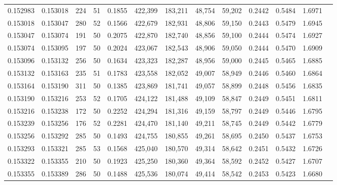 \begin{tabular}{rrrrrrrrrrrrr}
0.152983 & 0.153018 &   224 &  51 &                                     0.1855 & 422,399 & 183,211 &  48,754 &  59,202 & 0.2442 & 0.5484 & 1.6971 \\
0.153018 & 0.153047 &   280 &  52 &                                     0.1566 & 422,679 & 182,931 &  48,806 &  59,150 & 0.2443 & 0.5479 & 1.6945 \\
0.153047 & 0.153074 &   191 &  50 &                                     0.2075 & 422,870 & 182,740 &  48,856 &  59,100 & 0.2444 & 0.5474 & 1.6927 \\
0.153074 & 0.153095 &   197 &  50 &                                     0.2024 & 423,067 & 182,543 &  48,906 &  59,050 & 0.2444 & 0.5470 & 1.6909 \\
0.153096 & 0.153132 &   256 &  50 &                                     0.1634 & 423,323 & 182,287 &  48,956 &  59,000 & 0.2445 & 0.5465 & 1.6885 \\
0.153132 & 0.153163 &   235 &  51 &                                     0.1783 & 423,558 & 182,052 &  49,007 &  58,949 & 0.2446 & 0.5460 & 1.6864 \\
0.153164 & 0.153190 &   311 &  50 &                                     0.1385 & 423,869 & 181,741 &  49,057 &  58,899 & 0.2448 & 0.5456 & 1.6835 \\
0.153190 & 0.153216 &   253 &  52 &                                     0.1705 & 424,122 & 181,488 &  49,109 &  58,847 & 0.2449 & 0.5451 & 1.6811 \\
0.153216 & 0.153238 &   172 &  50 &                                     0.2252 & 424,294 & 181,316 &  49,159 &  58,797 & 0.2449 & 0.5446 & 1.6795 \\
0.153239 & 0.153256 &   176 &  52 &                                     0.2281 & 424,470 & 181,140 &  49,211 &  58,745 & 0.2449 & 0.5442 & 1.6779 \\
0.153256 & 0.153292 &   285 &  50 &                                     0.1493 & 424,755 & 180,855 &  49,261 &  58,695 & 0.2450 & 0.5437 & 1.6753 \\
0.153293 & 0.153321 &   285 &  53 &                                     0.1568 & 425,040 & 180,570 &  49,314 &  58,642 & 0.2451 & 0.5432 & 1.6726 \\
0.153322 & 0.153355 &   210 &  50 &                                     0.1923 & 425,250 & 180,360 &  49,364 &  58,592 & 0.2452 & 0.5427 & 1.6707 \\
0.153355 & 0.153389 &   286 &  50 &                                     0.1488 & 425,536 & 180,074 &  49,414 &  58,542 & 0.2453 & 0.5423 & 1.6680 \\

\end{tabular}

